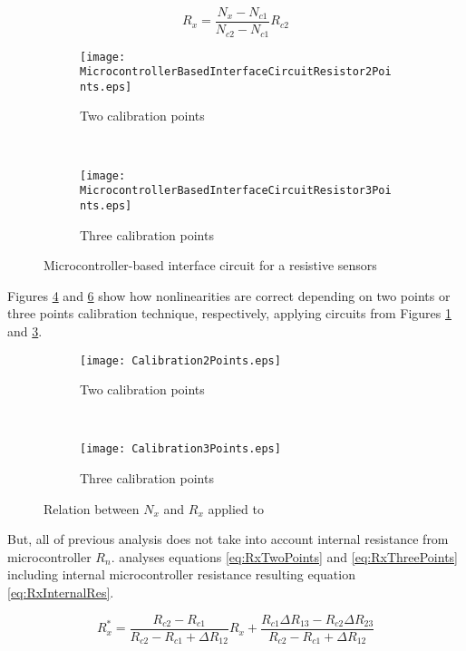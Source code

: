 \begin{equation}
\label{eq:RxThreePoints}
R_{x} = \frac{N_{x}-N_{c1}}{N_{c2}-N_{c1}}R_{c2}
\end{equation}

\begin{figure}[h]
\centering
	\begin{subfigure}{0.45\textwidth}
	\texttt{[image: MicrocontrollerBasedInterfaceCircuitResistor2Points.eps]}
	\caption{Two calibration points}
	\label{fig:MicrocontrollerBasedInterfaceCircuitResistor2Points}
	\end{subfigure}
	~
	\begin{subfigure}{0.45\textwidth}
	\texttt{[image: MicrocontrollerBasedInterfaceCircuitResistor3Points.eps]}
	\caption{Three calibration points}
	\label{fig:MicrocontrollerBasedInterfaceCircuitResistor3Points}
	\end{subfigure}
\caption{Microcontroller-based interface circuit for a resistive sensors}
\end{figure}

Figures \ref{fig:Calibration2Points} and \ref{fig:Calibration3Points} show how nonlinearities are correct depending on two points or three points calibration technique, respectively, applying circuits from Figures \ref{fig:MicrocontrollerBasedInterfaceCircuitResistor2Points} and \ref{fig:MicrocontrollerBasedInterfaceCircuitResistor3Points}.
\medskip

\begin{figure}[!ht]
\centering
	\begin{subfigure}{0.75\textwidth}
	\texttt{[image: Calibration2Points.eps]}
	\caption{Two calibration points}
	\label{fig:Calibration2Points}
	\end{subfigure}
	~
	\begin{subfigure}{0.75\textwidth}
	\texttt{[image: Calibration3Points.eps]}
	\caption{Three calibration points}
	\label{fig:Calibration3Points}
	\end{subfigure}
\caption{Relation between $N_{x}$ and $R_{x}$ applied to}
\end{figure}

But, all of previous analysis does not take into account internal resistance from microcontroller $R_{n}$. \cite{Art:Accuracy} analyses equations \eqref{eq:RxTwoPoints} and \eqref{eq:RxThreePoints} including internal microcontroller resistance resulting equation \eqref{eq:RxInternalRes}.

\begin{equation}
\label{eq:RxInternalRes}
R_{x}^{*} = \frac{R_{c2}-R_{c1}}{R_{c2}-R_{c1}+\Delta R_{12}}R_{x}+\frac{R_{c1}\Delta R_{13}-R_{c2}\Delta R_{23}}{R_{c2}-R_{c1}+\Delta R_{12}}
\end{equation}

